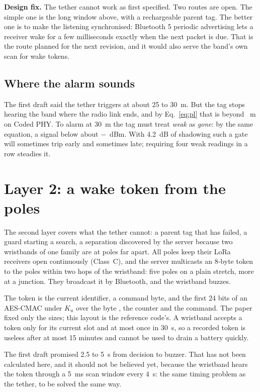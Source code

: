 \documentclass[11pt,a4paper,twoside,openany]{book}
\begin{document}
\begin{finding}\textbf{Design fix.} The tether cannot work as first specified. Two routes are open. The simple one is
the long window above, with a rechargeable parent tag. The better one is to make the listening synchronised: Bluetooth
5 periodic advertising lets a receiver wake for a few milliseconds exactly when the next packet is due. That is the
route planned for the next revision, and it would also serve the band's own scan for wake tokens.\end{finding}

\subsection*{Where the alarm sounds}
The first draft said the tether triggers at about 25 to 30~m. But the tag stops hearing the band where the radio link
ends, and by Eq.~\ref{eq:pl} that is beyond \TetherRange~m on Coded PHY. To alarm at 30~m the tag must treat
\emph{weak} as \emph{gone}: by the same equation, a signal below about $-$\TetherGate~dBm. With 4.2~dB of shadowing
such a gate will sometimes trip early and sometimes late; requiring four weak readings in a row steadies it.

\section{Layer 2: a wake token from the poles}
The second layer covers what the tether cannot: a parent tag that has failed, a guard starting a search, a separation
discovered by the server because two wristbands of one family are at poles far apart. All poles keep their LoRa
receivers open continuously (Class~C), and the server multicasts an 8-byte token to the poles within two hops of the
wristband: five poles on a plain stretch, more at a junction. They broadcast it by Bluetooth, and the wristband buzzes.

The token is the current identifier, a command byte, and the first 24 bits of an AES-CMAC under $K_u$ over the
byte , the counter and the command. The paper fixed only the sizes; this layout is the reference
code's. A wristband accepts a token only for its current slot and at most once in 30~s, so a recorded token is useless
after at most 15 minutes and cannot be used to drain a battery quickly.

The first draft promised 2.5 to 5~s from decision to buzzer. That has not been calculated here, and it should not be
believed yet, because the wristband hears the token through a 5~ms scan window every 4~s: the same timing problem as
the tether, to be solved the same way.
\end{document}
